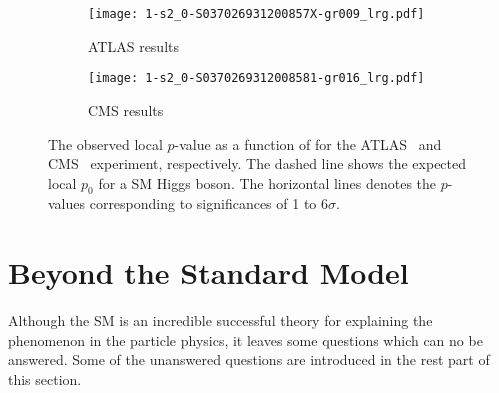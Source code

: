 \begin{figure}[htbp]
    \begin{center}
        \begin{subfigure}[b]{0.48\textwidth}
            \begin{center}
                \texttt{[image: 1-s2\_0-S037026931200857X-gr009\_lrg.pdf]}
                \caption{ATLAS results}
            \end{center}
        \end{subfigure}%
        \begin{subfigure}[b]{0.48\textwidth}
            \begin{center}
                \texttt{[image: 1-s2\_0-S0370269312008581-gr016\_lrg.pdf]}
                \caption{CMS results}
            \end{center}
        \end{subfigure}
    \end{center}
    \caption{The observed local $p$-value as a function of \mH for the ATLAS~\cite{Aad:2012tfa} and CMS~\cite{Chatrchyan:2012xdj} experiment, respectively.
    The dashed line shows the expected local $p_{0}$ for a SM Higgs boson.
    The horizontal lines denotes the $p$-values corresponding to significances of 1 to 6$\sigma$.}
    \label{fig:sm_discovery_of_Higgs}
\end{figure}


\section{Beyond the Standard Model}
\label{sec:sm_bsm}
Although the SM is an incredible successful theory for explaining the phenomenon in the particle physics, it leaves some questions which can no be answered.
Some of the unanswered questions are introduced in the rest part of this section.


